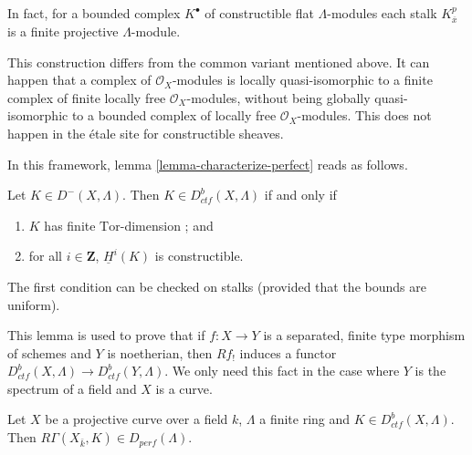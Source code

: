 \begin{remark}
\label{remark-projective-each-degree}
In fact, for a bounded complex $K^\bullet$ of constructible flat
$\Lambda$-modules each stalk $K^p_{\overline{x}}$ is a finite projective
$\Lambda$-module.
\end{remark}

\begin{remark}
\label{remark-different}
This construction differs from the common variant mentioned above. It can
happen that a complex of $\mathcal{O}_X$-modules is locally quasi-isomorphic to
a finite complex of finite locally free $\mathcal{O}_X$-modules, without being
globally quasi-isomorphic to a bounded complex of locally free
$\mathcal{O}_X$-modules. This does not happen in the \'etale site for
constructible sheaves.
\end{remark}

\noindent
In this framework, lemma \ref{lemma-characterize-perfect} reads as
follows.

\begin{lemma}
\label{lemma-when-ctf}
Let $K\in D^-(X, \Lambda)$. Then $K\in D_{ctf}^b(X, \Lambda)$ if and only if
\begin{enumerate}
\item
$K$ has finite $\text{Tor}$-dimension ; and
\item
for all $i \in \mathbf{Z}$, $\underline{H}^i(K)$ is constructible.
\end{enumerate}
\end{lemma}

\noindent
The first condition can be checked on stalks (provided that the bounds are
uniform).

\begin{remark}
\label{remark-how-used}
This lemma is used to prove that if $f: X \to Y$ is a separated, finite type
morphism of schemes and $Y$ is noetherian, then $Rf_!$ induces a functor
$D_{ctf}^b(X, \Lambda) \to D_{ctf}^b (Y, \Lambda)$. We only need this fact in
the case where $Y$ is the spectrum of a field and $X$ is a curve.
\end{remark}

\begin{proposition}
\label{proposition-projective-curve-constructible-cohomology}
Let $X$ be a projective curve over a field $k$, $\Lambda$ a finite ring and
$K\in D_{ctf}^b (X, \Lambda)$. Then $R\Gamma(X_{\bar k}, K)\in
D_{perf}(\Lambda)$.
\end{proposition}

